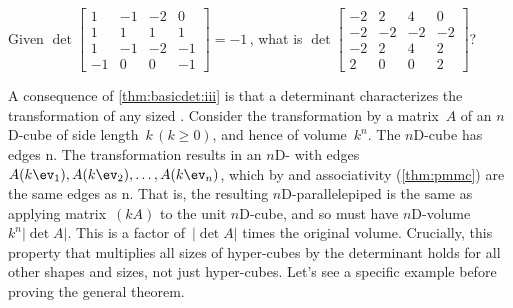 \begin{activity}\sloppy
Given
\(\det\begin{bmatrix} 1&-1&-2&0
\\1&1&1&1
\\1&-1&-2&-1
\\-1&0&0&-1 \end{bmatrix}=-1\)\,,
what is 
\(\det\begin{bmatrix} -2&2&4&0
\\-2&-2&-2&-2
\\-2&2&4&2
\\2&0&0&2 \end{bmatrix}\)?
\end{activity}


A consequence of \cref{thm:basicdet:iii} is that a determinant characterizes the transformation of any sized . 
Consider the transformation by a matrix~\(A\) of an $n$D-cube of side length~\(k\,(k\geq0)\), and hence of volume~\(k^n\).
The $n$D-cube has edges n.
The transformation results in an $n$D- with edges \(A(k\ev_1),A(k\ev_2),\ldots,A(k\ev_n)\), which by  and associativity (\cref{thm:pmmc}) are the same edges as n.
That is, the resulting $n$D-parallelepiped is the same as applying matrix~\((kA)\) to the unit $n$D-cube, and so must have $n$D-volume~\(k^n|\det A|\).
This is a factor of~\(|\det A|\) times the original volume.
Crucially, this property that  multiplies all sizes of hyper-cubes by the determinant holds for all other shapes and sizes, not just hyper-cubes.
Let's see a specific example before proving the general theorem.

